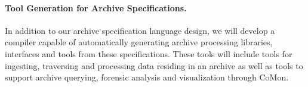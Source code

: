 \paragraph*{Tool Generation for Archive Specifications.}  In addition to our archive
specification language design, we will develop a compiler capable of automatically
generating archive processing libraries, interfaces and tools from these specifications.  
These tools will 
include tools for ingesting, traversing and processing data residing in an archive
as well as tools to support archive querying, forensic analysis and visualization through CoMon.